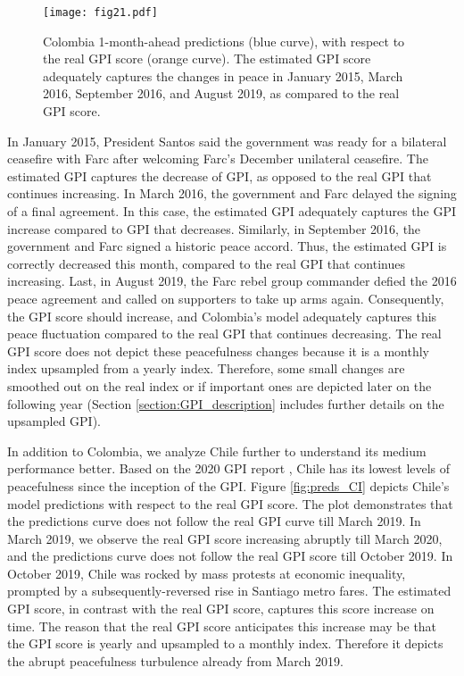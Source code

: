 \documentclass{bmcart}
\begin{document}
\begin{figure}[h!]
\centering
\texttt{[image: fig21.pdf]}
  \caption{ Colombia 1-month-ahead predictions (blue curve), with respect to the real GPI score (orange curve). The estimated GPI score adequately captures the changes in peace in January 2015, March 2016, September 2016, and August 2019, as compared to the real GPI score.}
\label{fig:preds_CO}
\end{figure}

In January 2015, President Santos said the government was ready for a bilateral ceasefire with Farc after welcoming Farc's December unilateral ceasefire. 
The estimated GPI captures the decrease of GPI, as opposed to the real GPI that continues increasing. 
In March 2016, the government and Farc delayed the signing of a final agreement. 
In this case, the estimated GPI adequately captures the GPI increase compared to GPI that decreases. 
Similarly, in September 2016, the government and Farc signed a historic peace accord. Thus, the estimated GPI is correctly decreased this month, compared to the real GPI that continues increasing. 
Last, in August 2019, the Farc rebel group commander defied the 2016 peace agreement and called on supporters to take up arms again. 
Consequently, the GPI score should increase, and Colombia's model adequately captures this peace fluctuation compared to the real GPI that continues decreasing. 
The real GPI score does not depict these peacefulness changes because it is a monthly index upsampled from a yearly index. Therefore, some small changes are smoothed out on the real index or if important ones are depicted later on the following year (Section \ref{section:GPI_description} includes further details on the upsampled GPI). 

In addition to Colombia, we analyze Chile further to understand its medium performance better. Based on the 2020 GPI report \cite{gpi_report_2020}, Chile has its lowest levels of peacefulness since the inception of the GPI. 
Figure \ref{fig:preds_CI} depicts Chile's model predictions with respect to the real GPI score. 
The plot demonstrates that the predictions curve does not follow the real GPI curve till March 2019. 
In March 2019, we observe the real GPI score increasing abruptly till March 2020, and the predictions curve does not follow the real GPI score till October 2019. 
In October 2019, Chile was rocked by mass protests at economic inequality, prompted by a subsequently-reversed rise in Santiago metro fares. 
The estimated GPI score, in contrast with the real GPI score, captures this score increase on time. 
The reason that the real GPI score anticipates this increase may be that the GPI score is yearly and upsampled to a monthly index. 
Therefore it depicts the abrupt peacefulness turbulence already from March 2019.
\end{document}
